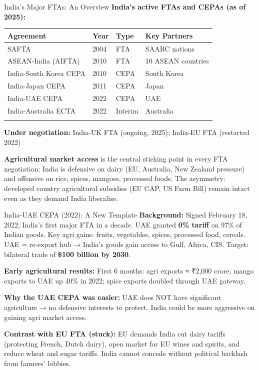 \documentclass[
  ignorenonframetext,
  aspectratio=169,
]{beamer}
\makeatletter
\let\quarto@originallabel\label
\DeclareRobustCommand*{\label}[1]{\quarto@originallabel{#1}}
\makeatother
\begin{document}
\begin{frame}{India's Major FTAs: An Overview}
\label{indias-major-ftas-an-overview}
\textbf{India's active FTAs and CEPAs (as of 2025):}

\begin{longtable}[]{@{}llll@{}}
\toprule\noalign{}
Agreement & Year & Type & Key Partners \\
\midrule\noalign{}
\endhead
SAFTA & 2004 & FTA & SAARC nations \\
ASEAN-India (AIFTA) & 2010 & FTA & 10 ASEAN countries \\
India-South Korea CEPA & 2010 & CEPA & South Korea \\
India-Japan CEPA & 2011 & CEPA & Japan \\
India-UAE CEPA & 2022 & CEPA & UAE \\
India-Australia ECTA & 2022 & Interim & Australia \\
\bottomrule\noalign{}
\end{longtable}

\textbf{Under negotiation:} India-UK FTA (ongoing, 2025); India-EU FTA
(restarted 2022)

\textbf{Agricultural market access} is the central sticking point in
every FTA negotiation: India is defensive on dairy (EU, Australia, New
Zealand pressure) and offensive on rice, spices, mangoes, processed
foods. The asymmetry: developed country agricultural subsidies (EU CAP,
US Farm Bill) remain intact even as they demand India liberalize.
\end{frame}

\begin{frame}{India-UAE CEPA (2022): A New Template}
\label{india-uae-cepa-2022-a-new-template}
\textbf{Background:} Signed February 18, 2022; India's first major FTA
in a decade. UAE granted \textbf{0\% tariff} on 97\% of Indian goods.
Key agri gains: fruits, vegetables, spices, processed food, cereals. UAE
= re-export hub → India's goods gain access to Gulf, Africa, CIS.
Target: bilateral trade of \textbf{\$100 billion by 2030}.

\textbf{Early agricultural results:} First 6 months: agri exports ≈
₹2,000 crore; mango exports to UAE up 40\% in 2022; spice exports
doubled through UAE gateway.

\textbf{Why the UAE CEPA was easier:} UAE does NOT have significant
agriculture → no defensive interests to protect. India could be more
aggressive on gaining agri market access.

\textbf{Contrast with EU FTA (stuck):} EU demands India cut dairy
tariffs (protecting French, Dutch dairy), open market for EU wines and
spirits, and reduce wheat and sugar tariffs. India cannot concede
without political backlash from farmers' lobbies.
\end{frame}
\end{document}
